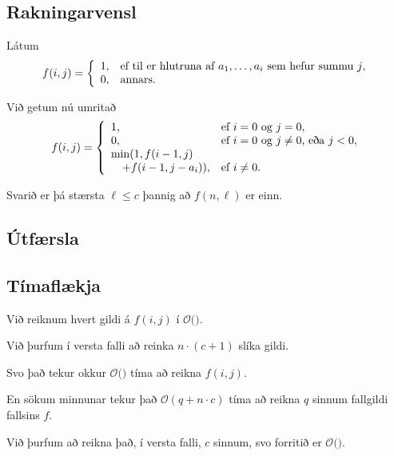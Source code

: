 \subsection{Rakningarvensl}
{
    {
        \item<1-> Látum
        \[
        f(i, j) =
            \left \{
            \env{array}
            {
                {l l}
                1, & \text{ef til er hlutruna af $a_1, \dots, a_i$ sem hefur summu $j$},\\
                0, & \text{annars}.
            }
            \right .
        \]
        \item<2-> Við getum nú umritað
        \[
            f(i, j) =
            \left \{
            \env{array}
            {
                {l l}
                1, & \text{ef $i = 0$ og $j = 0$},\\
                0, & \text{ef $i = 0$ og $j \neq 0$, eða $j < 0$},\\
                \min(1, f(i - 1, j) \\
                        \quad + f(i - 1, j - a_i)), & \text{ef $i \neq 0$}.
            }
            \right .
        \]
        \item<3-> Svarið er þá stærsta $\ell \leq c$ þannig að $f(n, \ell)$ er einn.
    }
}

\subsection{Útfærsla}
{
}

\subsection{Tímaflækja}
{
    {
        \item<1-> Við reiknum hvert gildi á $f(i, j)$ í $\mathcal{O}($$)$.
        \item<3-> Við þurfum í versta falli að reinka $n \cdot (c + 1)$ slíka gildi.
        \item<4-> Svo það tekur okkur $\mathcal{O}($$)$ tíma að reikna $f(i, j)$.
        \item<6-> En sökum minnunar tekur það $\mathcal{O}(q + n \cdot c)$ tíma að reikna $q$ sinnum fallgildi fallsins $f$.
        \item<7-> Við þurfum að reikna það, í versta falli, $c$ sinnum, svo forritið er $\mathcal{O}($$)$.
    }
}

